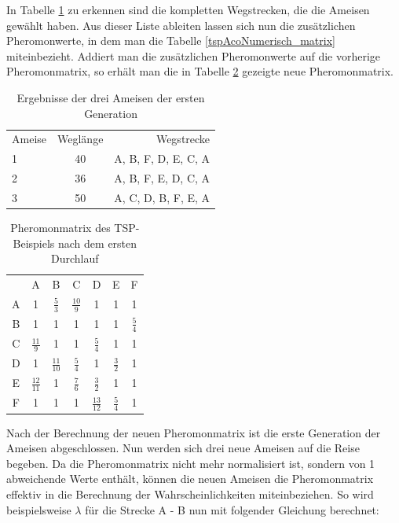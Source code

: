	\newpage
	In Tabelle \ref{tspAcoNumerisch_ergebnis_1} zu erkennen sind die kompletten Wegstrecken, die die Ameisen gewählt haben. Aus dieser Liste ableiten lassen sich nun die zusätzlichen Pheromonwerte, in dem man die Tabelle \ref{tspAcoNumerisch_matrix} miteinbezieht. Addiert man die zusätzlichen Pheromonwerte auf die vorherige Pheromonmatrix, so erhält man die in Tabelle \ref{tspAcoNumerisch_pheromon_1} gezeigte neue Pheromonmatrix.
	\begin{table}[h]
		\centering
		\footnotesize
		\begin{tabular}{l c r}
			Ameise & Weglänge & Wegstrecke \\
			1 & 40 & A, B, F, D, E, C, A\\
			2 & 36 & A, B, F, E, D, C, A\\ 
			3 & 50 & A, C, D, B, F, E, A\\
		\end{tabular}
		\caption{Ergebnisse der drei Ameisen der ersten Generation}
		\label{tspAcoNumerisch_ergebnis_1}
	\end{table}
	\begin{table}[h]
		\centering
		\footnotesize
		\begin{tabular}{c c c c c c c}
			& A & B & C & D & E & F \\
			A & 1 & $\frac{5}{3}$ & $\frac{10}{9}$ & 1 & 1 & 1\\ 
			B & 1 & 1 & 1 & 1 & 1 & $\frac{5}{4}$\\ 
			C & $\frac{11}{9}$ & 1 & 1 & $\frac{5}{4}$ & 1 & 1\\
			D & 1 & $\frac{11}{10}$ & $\frac{5}{4}$ & 1 & $\frac{3}{2}$ & 1\\
			E & $\frac{12}{11}$ & 1 & $\frac{7}{6}$ & $\frac{3}{2}$ & 1 & 1\\
			F & 1 & 1 & 1 & $\frac{13}{12}$ & $\frac{5}{4}$ & 1\\
		\end{tabular}
		\caption{Pheromonmatrix des TSP-Beispiels nach dem ersten Durchlauf}
	\label{tspAcoNumerisch_pheromon_1}
	\end{table}
	Nach der Berechnung der neuen Pheromonmatrix ist die erste Generation der Ameisen abgeschlossen. Nun werden sich drei neue Ameisen auf die Reise begeben. Da die Pheromonmatrix nicht mehr normalisiert ist, sondern von 1 abweichende Werte enthält, können die neuen Ameisen die Pheromonmatrix effektiv in die Berechnung der Wahrscheinlichkeiten miteinbeziehen. So wird beispielsweise $\lambda$ für die Strecke A - B nun mit folgender Gleichung berechnet:	
